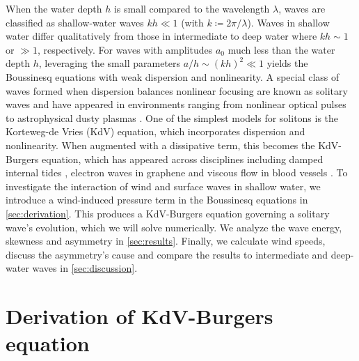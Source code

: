 \documentclass{jfm}
\begin{document}
When the water depth $h$ is small compared to the wavelength $\lambda$,
waves are classified as shallow-water waves $kh \ll 1$ (with $k
\coloneqq 2 \pi/\lambda$).
Waves in shallow water differ qualitatively from those in intermediate
to deep water where $kh \sim 1$ or $\gg 1$, respectively.
For waves with amplitudes $a_0$ much less than the water depth $h$,
leveraging the small parameters $a/h \sim (kh)^2 \ll 1$
yields the Boussinesq equations with weak dispersion and nonlinearity.
A special class of waves formed when dispersion balances nonlinear
focusing are known as solitary waves and have appeared in environments
ranging from nonlinear optical pulses \citep[\eg][]{kivshar1993dark} to
astrophysical dusty plasmas \citep[\eg][]{sahu2012nonextensive}.
One of the simplest models for solitons is the Korteweg-de Vries (KdV)
equation, which incorporates dispersion and nonlinearity.
When augmented with a dissipative term, this becomes the KdV-Burgers
equation, which has appeared across disciplines including damped
internal tides \citep[\eg][]{sandstrom1995dissipation}, electron waves
in graphene \citep[\eg][]{zdyrski2019effects} and viscous flow in blood
vessels \citep[\eg][]{antar1999weakly}.
To investigate the interaction of wind and surface waves in
shallow water, we introduce a wind-induced pressure term in the
Boussinesq equations in \cref{sec:derivation}.
This produces a KdV-Burgers equation governing a solitary wave's
evolution, which we will solve numerically.
We analyze the wave energy, skewness and asymmetry in
\cref{sec:results}.
Finally, we calculate wind speeds, discuss the asymmetry's cause and
compare the results to intermediate and deep-water waves in
\cref{sec:discussion}.

\section{\label{sec:derivation} Derivation of KdV-Burgers equation}
\end{document}
